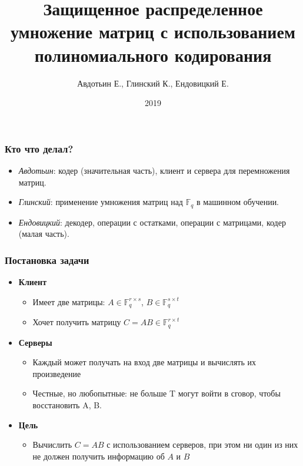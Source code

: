 \documentclass{beamer}
\title{Защищенное распределенное умножение матриц с использованием полиномиального кодирования}
\author{Авдотьин Е., Глинский К., Ендовицкий Е.}
\institute{МФТИ}
\date{2019}
\begin{document}
    
    \frame{\titlepage}
	\begin{frame}
		\frametitle{Кто что делал?}
		\begin{itemize}
			\item \emph{Авдотьин}: кодер (значительная часть), клиент и сервера для перемножения матриц.
			\item \emph{Глинский}: применение умножения матриц над $\mathbb{F}_{q}$ в машинном обучении.
			\item \emph{Ендовицкий}: декодер, операции с остатками, операции с матрицами, кодер (малая часть).
		\end{itemize}
	\end{frame}

    \begin{frame}
        \frametitle{Постановка задачи}
        \begin{itemize}
            \item<1-> \textbf{Клиент}
            \begin{itemize}
                \item Имеет две матрицы: $A \in \mathbb{F}_q^{r\times s}$, $B \in \mathbb{F}_q^{s\times t}$
                \item Хочет получить матрицу $C = AB \in \mathbb{F}_q^{r \times t}$
            \end{itemize}
            \item<2-> \textbf{Серверы}
            \begin{itemize}
                \item Каждый может получать на вход две матрицы и вычислять их произведение
		\item Честные, но любопытные: не больше T могут войти в сговор, чтобы восстановить A, B.
            \end{itemize}
            \item<3-> \textbf{Цель}
            \begin{itemize}
                \item Вычислить $C = AB$ с использованием серверов, при этом ни один из них не должен получить информацию об $A$ и $B$
            \end{itemize}
        \end{itemize}
    \end{frame}
\end{document}
